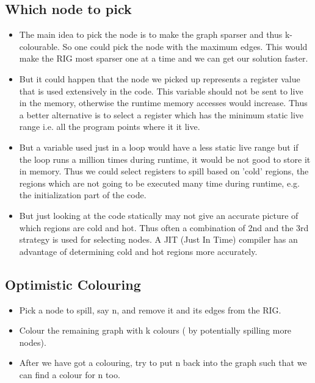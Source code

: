 \subsection{Which node to pick}
\begin{itemize}
    \item The main idea to pick the node is to make the graph sparser and thus k-colourable. So one could pick the node with the maximum edges. This would make the RIG most sparser one at a time and we can get our solution faster.
    \item But it could happen that the node we picked up represents a register value that is used extensively in the code. This variable should not be sent to live in the memory, otherwise the runtime memory accesses would increase. Thus a better alternative is to select a register which has the minimum static live range i.e. all the program points where it it live.
    \item But a variable used just in a loop would have a less static live range but if the loop runs a million times during runtime, it would be not good to store it in memory. Thus we could select registers to spill based on 'cold' regions, the regions which are not going to be executed many time during runtime, e.g. the initialization part of the code.
    \item But just looking at the code statically may not give an accurate picture of which regions are cold and hot. Thus often a combination of 2nd and the 3rd strategy is used for selecting nodes. A JIT (Just In Time) compiler has an advantage of determining cold and hot regions more accurately.
\end{itemize}
\subsection{Optimistic Colouring}
\begin{itemize}
    \item Pick a node to spill, say n, and remove it and its edges from the RIG.
    \item Colour the remaining graph with k colours ( by potentially spilling more nodes).
    \item After we have got a colouring, try to put n back into the graph such that we can find a colour for n too.
\end{itemize}
